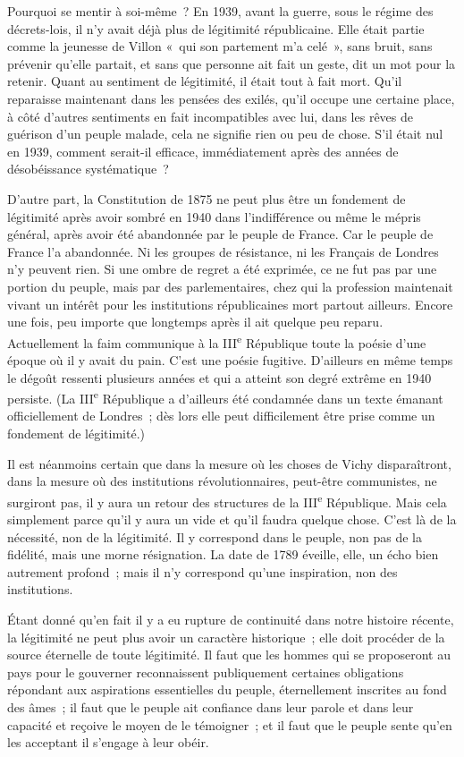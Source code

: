 \documentclass[french,twoside]{book} %
\begin{document}
Pourquoi se mentir à soi-même ? En 1939, avant la guerre, sous le régime des décrets-lois, il n'y avait déjà plus de légitimité républicaine. Elle était partie comme la jeunesse de Villon « qui son partement m'a celé », sans bruit, sans prévenir qu'elle partait, et sans que personne ait fait un geste, dit un mot pour la retenir. Quant au sentiment de légitimité, il était tout à fait mort. Qu'il reparaisse maintenant dans les pensées des exilés, qu'il occupe une certaine place, à côté d'autres sentiments en fait incompatibles avec lui, dans les rêves de guérison d'un peuple malade, cela ne signifie rien ou peu de chose. S'il était nul en 1939, comment serait-il efficace, immédiatement après des années de désobéissance systématique ?\par
D'autre part, la Constitution de 1875 ne peut plus être un fondement de légitimité après avoir sombré en 1940 dans l'indifférence ou même le mépris général, après avoir été abandonnée par le peuple de France. Car le peuple de France l'a abandonnée. Ni les groupes de résistance, ni les Français de Londres n'y peuvent rien. Si une ombre de regret a été exprimée, ce ne fut pas par une portion du peuple, mais par des parlementaires, chez qui la profession maintenait vivant un intérêt pour les institutions républicaines mort partout ailleurs. Encore une fois, peu importe que longtemps après il ait quelque peu reparu. Actuellement la faim communique à la III\textsuperscript{e} République toute la poésie d'une époque où il y avait du pain. C'est une poésie fugitive. D'ailleurs en même temps le dégoût ressenti plusieurs années et qui a atteint son degré extrême en 1940 persiste. (La III\textsuperscript{e} République a d'ailleurs été condamnée dans un texte émanant officiellement de Londres ; dès lors elle peut difficilement être prise comme un fondement de légitimité.)\par
Il est néanmoins certain que dans la mesure où les choses de Vichy disparaîtront, dans la mesure où des institutions révolutionnaires, peut-être communistes, ne surgiront pas, il y aura un retour des structures de la III\textsuperscript{e} République. Mais cela simplement parce qu'il y aura un vide et qu'il faudra quelque chose. C'est là de la nécessité, non de la légitimité. Il y correspond dans le peuple, non pas de la fidélité, mais une morne résignation. La date de 1789 éveille, elle, un écho bien autrement profond ; mais il n'y correspond qu'une inspiration, non des institutions.\par
Étant donné qu'en fait il y a eu rupture de continuité dans notre histoire récente, la légitimité ne peut plus avoir un caractère historique ; elle doit procéder de la source éternelle de toute légitimité. Il faut que les hommes qui se proposeront au pays pour le gouverner reconnaissent publiquement certaines obligations répondant aux aspirations essentielles du peuple, éternellement inscrites au fond des âmes ; il faut que le peuple ait confiance dans leur parole et dans leur capacité et reçoive le moyen de le témoigner ; et il faut que le peuple sente qu'en les acceptant il s'engage à leur obéir.\par
\end{document}
